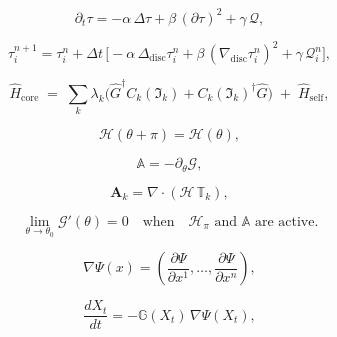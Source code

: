 \[
\partial_t \tau = -\alpha\,\Delta\tau + \beta\,(\partial\tau)^2 + \gamma\,\mathcal{Q},
\]

\[
\tau^{n+1}_i = \tau^n_i + \Delta t\,
\Big[-\alpha\,\Delta_{\mathrm{disc}}\tau^n_i
      + \beta\,(\nabla_{\mathrm{disc}}\tau^n_i)^2
      + \gamma\,\mathcal{Q}^n_i\Big],
\]

\[
\hat{H}_{\mathrm{core}}
   \;=\;
   \sum_{k} \lambda_k
      \bigl(
        \hat{G}^\dagger C_k(\mathfrak{I}_k)
        + C_k(\mathfrak{I}_k)^\dagger \hat{G}
      \bigr)
   \;+\; \hat{H}_{\mathrm{self}},
  \label{eq:white-core-hamiltonian}
\]

\[
\mathscr{H}(\theta + \pi) = \mathscr{H}(\theta),
\]

\[
\mathbb{A} = -\partial_\theta \mathscr{G},
\]

\[
\mathbf{A}_k = \nabla \cdot (\mathscr{H}\,\mathbb{T}_k),
\]

\[
\lim_{\theta \to \theta_0} \mathscr{G}'(\theta) = 0
\quad\text{when}\quad 
\mathscr{H}_{\pi} \text{ and } \mathbb{A} \text{ are active.}
\]

\[
\nabla \Psi (x) = \left( \frac{\partial \Psi}{\partial x^1}, \ldots, \frac{\partial \Psi}{\partial x^n} \right),
\]

\[
\frac{dX_t}{dt} = -\mathbb{G}(X_t)\,\nabla\Psi(X_t),
\]

